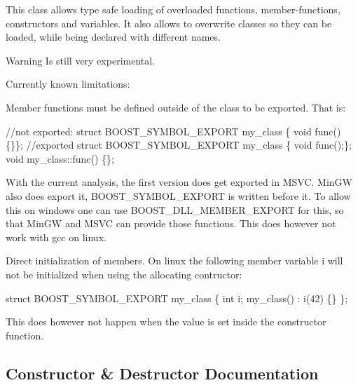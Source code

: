 This class allows type safe loading of overloaded functions, member-\/functions, constructors and variables. It also allows to overwrite classes so they can be loaded, while being declared with different names.

\begin{DoxyWarning}{Warning}
Is still very experimental.
\end{DoxyWarning}
Currently known limitations\+:

Member functions must be defined outside of the class to be exported. That is\+: 
\begin{DoxyCode}
\textcolor{comment}{//not exported:}
\textcolor{keyword}{struct }BOOST\_SYMBOL\_EXPORT my\_class \{ \textcolor{keywordtype}{void} func() \{\}\};
\textcolor{comment}{//exported}
\textcolor{keyword}{struct }BOOST\_SYMBOL\_EXPORT my\_class \{ \textcolor{keywordtype}{void} func();\};
\textcolor{keywordtype}{void} my\_class::func() \{\};
\end{DoxyCode}


With the current analysis, the first version does get exported in M\+S\+VC. Min\+GW also does export it, B\+O\+O\+S\+T\+\_\+\+S\+Y\+M\+B\+O\+L\+\_\+\+E\+X\+P\+O\+RT is written before it. To allow this on windows one can use B\+O\+O\+S\+T\+\_\+\+D\+L\+L\+\_\+\+M\+E\+M\+B\+E\+R\+\_\+\+E\+X\+P\+O\+RT for this, so that Min\+GW and M\+S\+VC can provide those functions. This does however not work with gcc on linux.

Direct initialization of members. On linux the following member variable i will not be initialized when using the allocating contructor\+: 
\begin{DoxyCode}
\textcolor{keyword}{struct }BOOST\_SYMBOL\_EXPORT my\_class \{ \textcolor{keywordtype}{int} i; my\_class() : i(42) \{\} \};
\end{DoxyCode}


This does however not happen when the value is set inside the constructor function. 

\subsection{Constructor \& Destructor Documentation}
\mbox{\label{a01712_af1fa4c4ed871e889f92f4c11d574d91f}} 
